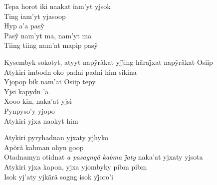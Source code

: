 \begin{linenumbers}
 
\noindent   Tepa horot iki naakat iam'yt yjsok\\
  Ting iam'yt yjasoop\\
  Hyp a’a pasỹ\\
  Pasỹ nam’yt ma, nam’yt ma\\
  Tiing tiing nam’at mapip pasỹ
 
\end{linenumbers}

\bigskip

\begin{linenumbers}
 
\noindent   Kysembyk sokotyt, atyyt napỹrãkat yjj̃ing hãraj̃xat napỹrãkat Osiip\\
  Atykiri imbodn oko padni padni him sikina\\
  Yjopop bik nam'at Osiip tepy\\
  Yjsi kapydn 'a\\
  Xooo kin, naka'at yjsi\\
  Pynpyso'y yjopo\\
  Atykiri yjxa naokyt him
 
\end{linenumbers}

\bigskip

\begin{linenumbers}
 
\noindent   Atykiri pyryhadnan yjxaty yjhyko\\
  Apõrã kabman ohyn goop\\
  Otadnamyn otidnat \textit{a pasagngã kabma j̃aty} naka’at yjxaty yjsota\\
  Atykiri yjxa kapon, yjxa yjombyky pibm pibm\\
  Isok yj’aty yjkãrã sogng isok yj̃oro’i
 
\end{linenumbers}

